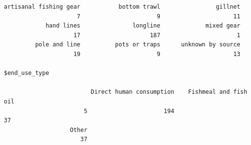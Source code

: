 \documentclass[
  letterpaper,
  oneside,
  open=any]{scrbook}
\newenvironment{Shaded}{\begin{snugshade}}{\end{snugshade}}
\newcommand{\CommentTok}[1]{\textcolor[rgb]{0.37,0.37,0.37}{#1}}
\newcommand{\DecValTok}[1]{\textcolor[rgb]{0.68,0.00,0.00}{#1}}
\newcommand{\FloatTok}[1]{\textcolor[rgb]{0.68,0.00,0.00}{#1}}
\newcommand{\NormalTok}[1]{\textcolor[rgb]{0.00,0.23,0.31}{#1}}
\newcommand{\OtherTok}[1]{\textcolor[rgb]{0.00,0.23,0.31}{#1}}
\newcommand{\SpecialCharTok}[1]{\textcolor[rgb]{0.37,0.37,0.37}{#1}}
\begin{document}
\begin{verbatim}
artisanal fishing gear           bottom trawl                gillnet 
                     7                      9                     11 
            hand lines               longline             mixed gear 
                    17                    187                      1 
         pole and line          pots or traps      unknown by source 
                    19                      9                     13 

$end_use_type

                         Direct human consumption    Fishmeal and fish oil 
                       5                      194                       37 
                   Other 
                      37 
\end{verbatim}

\begin{Shaded}
\end{Shaded}
\end{document}
